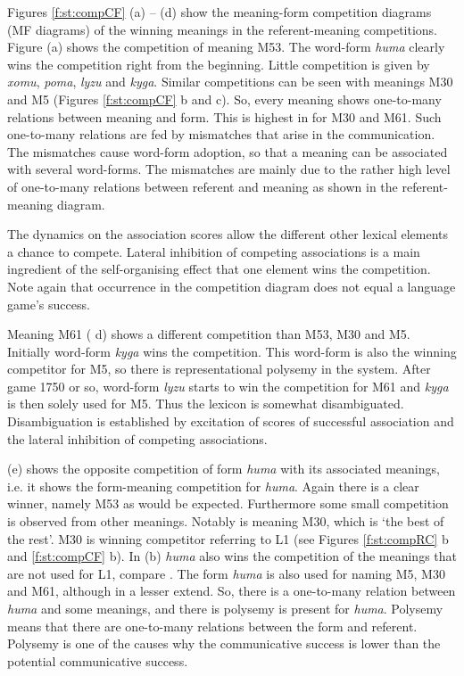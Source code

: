 Figures \ref{f:st:compCF} (a) -- (d) show the meaning-form competition diagrams (MF diagrams) of the winning meanings in the referent-meaning competitions. Figure (a) shows the competition of meaning M53. The word-form {\it huma} clearly wins the competition right from the beginning. Little competition is given by {\it xomu}, {\it poma}, {\it lyzu} and {\it kyga}. Similar competitions can be seen with meanings M30 and M5 (Figures \ref{f:st:compCF} b and c). So, every meaning shows one-to-many relations between meaning and form. This is highest in for M30 and M61. Such one-to-many relations are fed by mismatches that arise in the communication. The mismatches cause word-form adoption, so that a meaning can be associated with several word-forms. The mismatches are mainly due to the rather high level of one-to-many relations between referent and meaning as shown in the referent-meaning diagram. 

The dynamics on the association scores allow the different other lexical elements a chance to compete. Lateral inhibition of competing associations is a main ingredient of the self-organising effect that one element wins the competition. Note again that occurrence in the competition diagram does not equal a language game's success.



Meaning M61 ( d) shows a different competition than M53, M30 and M5. Initially word-form {\it kyga} wins the competition. This word-form is also the winning competitor for M5, so there is representational polysemy in the system. After game 1750 or so, word-form {\it lyzu} starts to win the competition for M61 and {\it kyga} is then solely used for M5. Thus the lexicon is somewhat disambiguated. Disambiguation is established by excitation of scores of successful association and the lateral inhibition of competing associations.


 (e) shows the opposite competition of form {\it huma} with its associated meanings, i.e. it shows the form-meaning competition for {\it huma}. Again there is a clear winner, namely M53 as would be expected. Furthermore some small competition is observed from other meanings. Notably is meaning M30, which is `the best of the rest'. M30 is winning competitor referring to L1 (see Figures \ref{f:st:compRC} b and \ref{f:st:compCF} b). In  (b) {\it huma} also wins the competition of the meanings that are not used for L1, compare .  The form {\it huma} is also used for naming M5, M30 and M61, although in a lesser extend. So, there is a one-to-many relation between {\it huma} and some meanings, and there is polysemy is present for {\it huma}. Polysemy means that there are one-to-many relations between the form and referent. Polysemy is one of the causes why the communicative success is lower than the potential communicative success.

